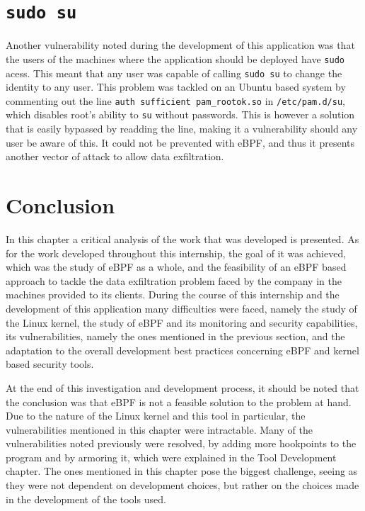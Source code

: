 \section{\texttt{sudo su}}
Another vulnerability noted during the development of this application was that the users of the machines where the application should be deployed have \texttt{sudo} acess. This meant that any user was capable of calling \texttt{sudo su} to change the identity to any user. This problem was tackled on an Ubuntu based system by commenting out the line \texttt{auth sufficient pam\_rootok.so} in \texttt{/etc/pam.d/su}, which disables root's ability to \texttt{su} without passwords. This is however a solution that is easily bypassed by readding the line, making it a vulnerability should any user be aware of this. It could not be prevented with eBPF, and thus it presents another vector of attack to allow data exfiltration.

\section{Conclusion}
In this chapter a critical analysis of the work that was developed is presented.
As for the work developed throughout this internship, the goal of it was achieved, which was the study of eBPF as a whole, and the feasibility of an eBPF based approach to tackle the data exfiltration problem faced by the company in the machines provided to its clients. During the course of this internship and the development of this application many difficulties were faced, namely the study of the Linux kernel, the study of eBPF and its monitoring and security capabilities, its vulnerabilities, namely the ones mentioned in the previous section, and the adaptation to the overall development best practices concerning eBPF and kernel based security tools.

At the end of this investigation and development process, it should be noted that the conclusion was that eBPF is not a feasible solution to the problem at hand. Due to the nature of the Linux kernel and this tool in particular, the vulnerabilities mentioned in this chapter were intractable. Many of the vulnerabilities noted previously were resolved, by adding more hookpoints to the program and by armoring it, which were explained in the Tool Development chapter. The ones mentioned in this chapter pose the biggest challenge, seeing as they were not dependent on development choices, but rather on the choices made in the development of the tools used.

